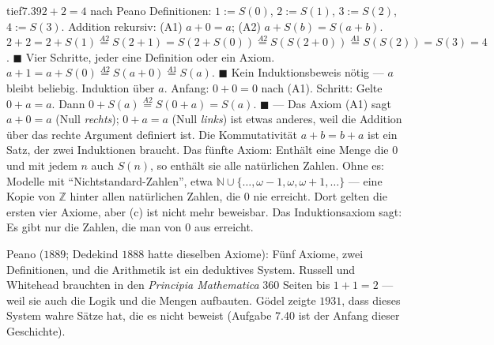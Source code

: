 \begin{loesungkarte}{tief}{7.39}{$2 + 2 = 4$ nach Peano}
Definitionen: $1 := S(0)$, $2 := S(1)$, $3 := S(2)$, $4 := S(3)$. Addition rekursiv: (A1) $a + 0 = a$; (A2) $a + S(b) = S(a + b)$. \\
$2 + 2 = 2 + S(1) \overset{A2}{=} S(2 + 1) = S(2 + S(0)) \overset{A2}{=} S(S(2 + 0)) \overset{A1}{=} S(S(2)) = S(3) = 4$. $\blacksquare$ Vier Schritte, jeder eine Definition oder ein Axiom.
$a + 1 = a + S(0) \overset{A2}{=} S(a + 0) \overset{A1}{=} S(a)$. $\blacksquare$ Kein Induktionsbeweis nötig --- $a$ bleibt beliebig.
Induktion über $a$. Anfang: $0 + 0 = 0$ nach (A1). Schritt: Gelte $0 + a = a$. Dann $0 + S(a) \overset{A2}{=} S(0 + a) = S(a)$. $\blacksquare$ --- Das Axiom (A1) sagt $a + 0 = a$ (Null \emph{rechts}); $0 + a = a$ (Null \emph{links}) ist etwas anderes, weil die Addition über das rechte Argument definiert ist. Die Kommutativität $a + b = b + a$ ist ein Satz, der zwei Induktionen braucht.
Das fünfte Axiom: Enthält eine Menge die $0$ und mit jedem $n$ auch $S(n)$, so enthält sie alle natürlichen Zahlen. Ohne es: Modelle mit \enquote{Nichtstandard-Zahlen}, etwa $\mathbb N\cup\{\dots, \omega - 1, \omega, \omega + 1, \dots\}$ --- eine Kopie von $\mathbb Z$ hinter allen natürlichen Zahlen, die $0$ nie erreicht. Dort gelten die ersten vier Axiome, aber (c) ist nicht mehr beweisbar. Das Induktionsaxiom sagt: Es gibt nur die Zahlen, die man von $0$ aus erreicht.
\begin{mitnehmen}\kastentext
Peano ($1889$; Dedekind $1888$ hatte dieselben Axiome): Fünf Axiome, zwei Definitionen, und die Arithmetik ist ein deduktives System. Russell und Whitehead brauchten in den \emph{Principia Mathematica} $360$ Seiten bis $1 + 1 = 2$ --- weil sie auch die Logik und die Mengen aufbauten. Gödel zeigte $1931$, dass dieses System wahre Sätze hat, die es nicht beweist (Aufgabe 7.40 ist der Anfang dieser Geschichte).
\end{mitnehmen}
\end{loesungkarte}

